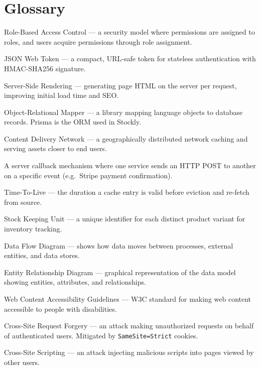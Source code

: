 \documentclass[12pt,a4paper]{report}
\begin{document}
\section*{Glossary}

\begin{description}[leftmargin=3cm, style=nextline]
    \item[RBAC] Role-Based Access Control --- a security model where permissions are assigned to roles, and users acquire permissions through role assignment.
    \item[JWT] JSON Web Token --- a compact, URL-safe token for stateless authentication with HMAC-SHA256 signature.
    \item[SSR] Server-Side Rendering --- generating page HTML on the server per request, improving initial load time and SEO.
    \item[ORM] Object-Relational Mapper --- a library mapping language objects to database records. Prisma is the ORM used in Stockly.
    \item[CDN] Content Delivery Network --- a geographically distributed network caching and serving assets closer to end users.
    \item[Webhook] A server callback mechanism where one service sends an HTTP POST to another on a specific event (e.g.\ Stripe payment confirmation).
    \item[TTL] Time-To-Live --- the duration a cache entry is valid before eviction and re-fetch from source.
    \item[SKU] Stock Keeping Unit --- a unique identifier for each distinct product variant for inventory tracking.
    \item[DFD] Data Flow Diagram --- shows how data moves between processes, external entities, and data stores.
    \item[ERD] Entity Relationship Diagram --- graphical representation of the data model showing entities, attributes, and relationships.
    \item[WCAG] Web Content Accessibility Guidelines --- W3C standard for making web content accessible to people with disabilities.
    \item[CSRF] Cross-Site Request Forgery --- an attack making unauthorized requests on behalf of authenticated users. Mitigated by \texttt{SameSite=Strict} cookies.
    \item[XSS] Cross-Site Scripting --- an attack injecting malicious scripts into pages viewed by other users.

\end{description}
\end{document}
